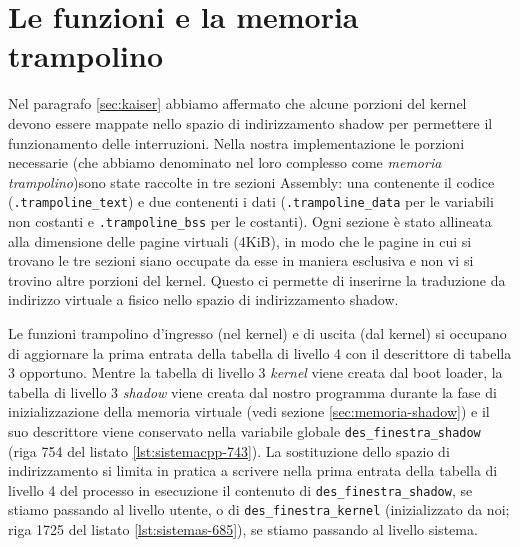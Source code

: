 \section{Le funzioni e la memoria trampolino}
Nel paragrafo \vref{sec:kaiser} abbiamo affermato che alcune porzioni del kernel devono essere mappate nello spazio di indirizzamento shadow per permettere il funzionamento delle interruzioni.
Nella nostra implementazione le porzioni necessarie (che abbiamo denominato nel loro complesso come \emph{memoria trampolino})sono state raccolte in tre sezioni Assembly: una contenente il codice (\texttt{.trampoline\_text}) e due contenenti i dati (\texttt{.trampoline\_data} per le variabili non costanti e \texttt{.trampoline\_bss} per le costanti).
Ogni sezione è stato allineata alla dimensione delle pagine virtuali (4KiB), in modo che le pagine in cui si trovano le tre sezioni siano occupate da esse in maniera esclusiva e non vi si trovino altre porzioni del kernel.
Questo ci permette di inserirne la traduzione da indirizzo virtuale a fisico nello spazio di indirizzamento shadow.

Le funzioni trampolino d'ingresso (nel kernel) e di uscita (dal kernel) si occupano di aggiornare la prima entrata della tabella di livello 4 con il descrittore di tabella 3 opportuno.
Mentre la tabella di livello 3 \emph{kernel} viene creata dal boot loader, la tabella di livello 3 \emph{shadow} viene creata dal nostro programma durante la fase di inizializzazione della memoria virtuale (vedi sezione \vref{sec:memoria-shadow}) e il suo descrittore viene conservato nella variabile globale \texttt{des\_finestra\_shadow} (riga 754 del listato \vref{lst:sistemacpp-743}).
La sostituzione dello spazio di indirizzamento si limita in pratica a scrivere nella prima entrata della tabella di livello 4 del processo in esecuzione il contenuto di \texttt{des\_finestra\_shadow}, se stiamo passando al livello utente, o di \texttt{des\_finestra\_kernel} (inizializzato da noi; riga 1725 del listato \vref{lst:sistemas-685}), se stiamo passando al livello sistema.

